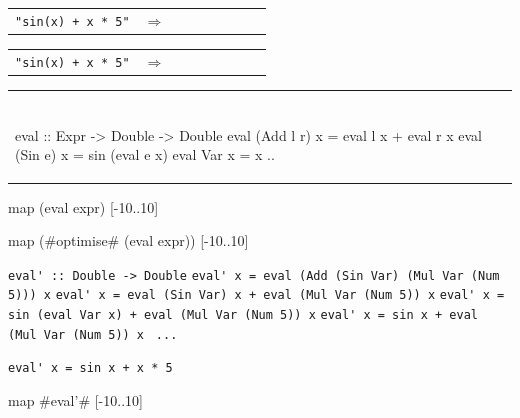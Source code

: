 \documentclass{beamer}
\newcommand{\ndist}{1.7cm}
\newcommand{\nshift}{0.8cm}
\newcommand{\nshiftw}{1.2cm}
\newcommand{\ncol}{blue!20!white}
\newcommand{\lcol}{red!20!white}
\newcommand{\tree}[5] {
\begin{figure}[H]
    \centering
        \begin{tikzpicture}[->,node distance=\ndist, semithick]
        	\tikzstyle{every node}=[
                                minimum width=1.4cm
                                ,minimum height=0.7cm]
            \node[draw,fill=\ncol](add) {#2};
            \node[draw,fill=\ncol](mul)[below of=add, xshift=\nshiftw] {#3};
            \node[draw,fill=\ncol](sin)[below of=add, xshift=-\nshiftw] {#1};
            \node[draw,fill=\lcol](x1)  [below of=sin, xshift=0cm] {#4};
            \node[draw,fill=\lcol](x2)  [below of=mul, xshift=-\nshift]  {#4};
            \node[draw,fill=\lcol](five)[below of=mul, xshift=\nshift]  {#5};
            \path (add) edge node {} (mul)
                        edge node {} (sin)
                  (mul) edge node {} (x2)
                        edge node {} (five)
                  (sin) edge node {} (x1);
        \end{tikzpicture}
\end{figure}

}
\begin{document}
\begin{frame}[fragile]
\centering
\begin{tabular}{ m{3.5cm} m{0.5cm} m{5cm} }
    \verb|"sin(x) + x * 5"| &  $\Rightarrow$
    &
	\tree{sin}{+}{*}{x}{5}
\\
\end{tabular}
\end{frame}

\begin{frame}[fragile]
\centering
\begin{tabular}{ m{3.5cm} m{0.5cm} m{5cm} }
    \verb|"sin(x) + x * 5"| & $\Rightarrow$
    &
	\tree{Sin}{Add}{Mul}{Var}{Num 5}
\\
\end{tabular}
\end{frame}

\begin{frame}[fragile]
\centering
\begin{tabular}{ m{10cm} }
\tree{Sin}{Add}{Mul}{Var}{Num 5} \\
\begin{codeEx}
eval :: Expr -> Double -> Double
eval (Add l r) x = eval l x + eval r x 
eval (Sin e)   x = sin (eval e x)
eval Var       x = x
..
\end{codeEx}
\\
\end{tabular}
\end{frame}

\begin{frame}[fragile]

\begin{codeEx}
map (eval expr) [-10..10]
\end{codeEx}

\end{frame}

\begin{frame}[fragile] 
\begin{codeExDiff}
map (#optimise# (eval expr)) [-10..10]
\end{codeExDiff}

\pause

\verb|eval' :: Double -> Double|
\pause
\verb|eval' x = eval (Add (Sin Var) (Mul Var (Num 5))) x|
\pause
\verb|eval' x = eval (Sin Var) x + eval (Mul Var (Num 5)) x|
\pause
\verb|eval' x = sin (eval Var x) + eval (Mul Var (Num 5)) x|
\pause
\verb|eval' x = sin x + eval (Mul Var (Num 5)) x |
\pause
\verb|...                          |

\verb|eval' x = sin x + x * 5|

\pause

\begin{codeExDiff}
map #eval'# [-10..10]
\end{codeExDiff}
\end{frame}
\end{document}
